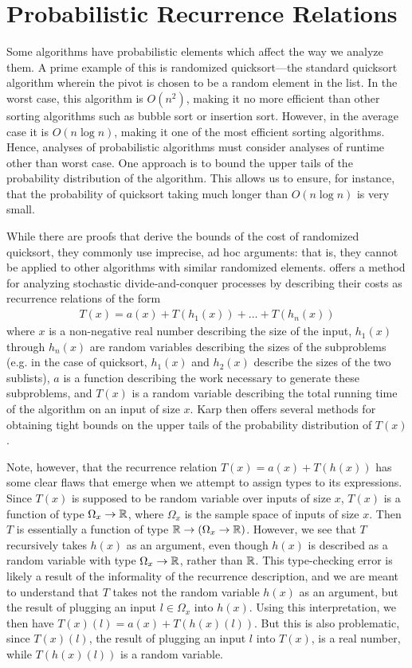 \section{Probabilistic Recurrence Relations}

Some algorithms have probabilistic elements which affect the way we analyze them. A prime example of this is randomized 
quicksort---the standard quicksort algorithm wherein the pivot is chosen to be a random element in the list. In the worst case,
this algorithm is $O(n^2)$, making it no more efficient than other sorting algorithms such as bubble sort or insertion sort. 
However, in the average case it is $O(n\log n)$, making it one of the most efficient sorting algorithms. Hence, analyses of probabilistic algorithms must consider analyses of runtime other than worst case. One approach is to bound the upper
tails of the probability distribution of the algorithm. This allows us to ensure, for instance, that the probability of 
quicksort taking much longer than $O(n \log n)$ is very small. 

While there are proofs that derive the bounds of the cost of randomized quicksort, they commonly use
imprecise, ad hoc arguments: that is, they cannot be applied to other algorithms with similar randomized elements. 
\cite{Karp} offers a method for analyzing stochastic divide-and-conquer processes by describing their costs as recurrence relations of the form
\begin{align*}
T(x) = a(x) + T(h_1(x)) + \dots + T(h_n(x))
\end{align*}
where $x$ is a non-negative real number describing the size of the input, $h_1(x)$ through $h_n(x)$ are random 
variables describing the sizes of the subproblems (e.g. in the case of quicksort, $h_1(x)$ and $h_2(x)$ describe the sizes 
of the two sublists), $a$ is a function describing the work necessary to generate these subproblems, and $T(x)$ is a 
random variable describing the total running time of the algorithm on an input of size $x$. Karp then offers several methods 
for obtaining tight bounds on the upper tails of the probability distribution of $T(x)$. 

Note, however, that the recurrence relation $T(x) = a(x) + T(h(x))$ has some clear flaws that 
emerge when we attempt to assign types to its expressions. Since $T(x)$ is supposed to be random
variable over inputs of size $x$, $T(x)$ is a function of type 
$\Omega_x \rightarrow \mathbb{R}$, where $\Omega_x$ is the sample space of inputs of size $x$. Then $T$ is essentially a 
function of type $\mathbb{R} \rightarrow (\Omega_x \rightarrow \mathbb{R})$. However, we see that $T$ recursively takes 
$h(x)$ as an argument, even though $h(x)$ is described as a random variable with type $\Omega_x \rightarrow \mathbb{R}$, 
rather than $\mathbb{R}$. This type-checking error is likely a result of the informality of the recurrence description, 
and we are meant to understand that $T$ takes not the 
random variable $h(x)$ as an argument, but the result of plugging an input $l \in \Omega_x$ into $h(x)$. Using this 
interpretation, we then have $T(x)(l) = a(x) + T(h(x)(l))$. But this is also problematic, since $T(x)(l)$, the result 
of plugging an input $l$ into $T(x)$, is a real number, while $T(h(x)(l))$ is a random variable. 

